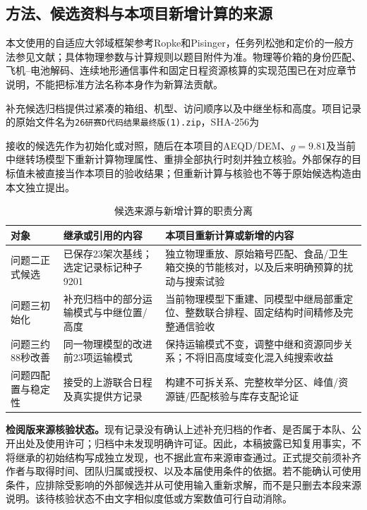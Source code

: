 \subsection{方法、候选资料与本项目新增计算的来源}
\label{app:source_provenance}
本文使用的自适应大邻域框架参考Ropke和Pisinger\cite{ropke2006alns}，任务列松弛和定价的一般方法参见文献\cite{barnhart1998branchprice}；具体物理参数与计算规则以题目附件为准。物理等价箱的身份匹配、飞机--电池解码、连续地形通信事件和固定日程资源核算的实现范围已在对应章节说明，不能把标准方法名称本身作为新算法贡献。

补充候选归档\cite{candidateArchive}提供过紧凑的箱组、机型、访问顺序以及中继坐标和高度。项目记录的原始文件名为\texttt{26研赛D代码结果最终版(1).zip}，SHA-256为
\begin{center}\begin{minipage}{.95\linewidth}\footnotesize{}\end{minipage}\end{center}
接收的候选先作为初始化或对照，随后在本项目的AEQD/DEM、$g=9.81$及当前中继转场模型下重新计算物理属性、重排全部执行时刻并独立核验。外部保存的目标值未被直接当作本项目的验收结果；但重新计算与核验也不等于原始候选构造由本文独立提出。

\begin{table}[htbp]\centering\small
\caption{候选来源与新增计算的职责分离}\label{tab:source_responsibility}
\begin{tabularx}{\linewidth}{p{3cm}XX}\toprule
对象 & 继承或引用的内容 & 本项目重新计算或新增的内容\\\midrule
问题二正式候选 & 已保存23架次基线；选定记录标记种子9201 & 独立物理重放、原始箱号匹配、食品/卫生箱交换的节能核对，以及后来明确预算的扰动与搜索试验\\
问题三初始化 & 补充归档中的部分运输模式与中继位置/高度 & 当前物理模型下重建、同模型中继局部重定位、整数联合排程、固定结构时间精修及完整通信验收\\
问题三约88秒改善 & 同一物理模型的改进前23项运输模式 & 保持运输模式不变，调整中继和资源同步关系；不将旧高度域变化混入纯搜索收益\\
问题四配置与稳定性 & 接受的上游联合日程及真实提供方记录 & 构建不可拆关系、完整枚举分区、峰值/资源链/匹配核验与库存支配论证\\\bottomrule
\end{tabularx}
\end{table}

\textbf{检阅版来源核验状态。}现有记录没有确认上述补充归档的作者、是否属于本队、公开出处及使用许可；归档中未发现明确许可证。因此，本稿披露已知复用事实，不将继承的初始结构写成独立发现，也不据此宣布来源审查通过。正式提交前须补齐作者与取得时间、团队归属或授权、以及本届使用条件的依据。若不能确认可使用条件，应排除受影响的外部候选并从可使用输入重新求解，而不是只删去本段来源说明。该待核验状态不由文字相似度低或方案数值可行自动消除。

